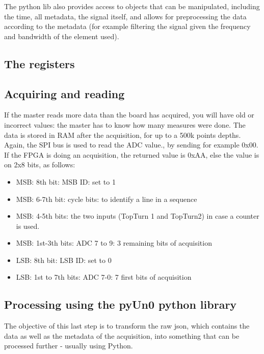 \documentclass{article}
\begin{document}
The python lib also provides access to objects that can be manipulated, including the time, all metadata, the signal itself, and allows for preprocessing the data according to the metadata (for example filtering the signal given the frequency and bandwidth of the element used).



\newpage
\subsection{The registers}



\subsection{Acquiring and reading}

If the master reads more data than the board has acquired, you will have old or incorrect values: the master has to know how many measures were done. The data is stored in RAM after the acquisition, for up to a 500k points depths. Again, the  SPI bus is used to read the ADC value., by sending for example 0x00. If the FPGA is doing an acquisition, the returned value is 0xAA, else the value is on 2x8 bits, as follows:

\begin{itemize}
\item MSB: 8th bit: MSB ID: set to 1
\item MSB: 6-7th bit: cycle bits: to identify a line in a sequence
\item MSB: 4-5th bits: the two inputs (TopTurn 1 and TopTurn2) in case a counter is used.
\item MSB: 1st-3th bits: ADC 7 to 9: 3 remaining bits of acquisition
\item LSB: 8th bit: LSB ID: set to 0
\item LSB: 1st to 7th bits: ADC 7-0: 7 first bits of acquisition
\end{itemize}



\newpage
\subsection{Processing using the pyUn0 python library}

The objective of this last step is to transform the raw json, which contains the data as well as the metadata of the acquisition, into something that can be processed further - usually using Python. 
\end{document}
